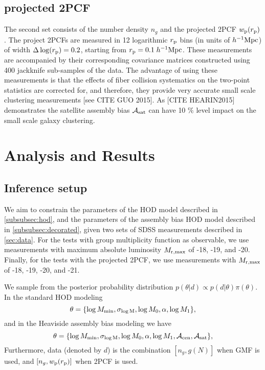 \documentclass[12pt, preprint]{aastex}
\newcommand{\beq}{\begin{equation}}
\newcommand{\eeq}{\end{equation}}
\newcommand{\mzero}{\log M_{0}}
\newcommand{\mone}{\log M_{1}}
\newcommand{\mmin}{\log M_{\rm min}}
\newcommand{\sigmam}{\sigma_{\log \rm M}}
\newcommand{\acen}{\mathcal{A}_{\rm cen}}
\newcommand{\asat}{\mathcal{A}_{\rm sat}}
\begin{document}
\subsection{projected 2PCF}

The second set consists of the number density $n_{g}$ and the projected 2PCF $w_{\rm{p}}(r_{\rm{p}})$. The project 2PCFs are measured in 12 logarithmic $r_{\rm p}$ bins (in units of $h^{-1}\rm{Mpc}$) of width $\Delta \log(r_{\rm p}) = 0.2$, starting from $r_{\rm{p}} = 0.1 \; h^{-1}\rm{Mpc}$. These measurements are accompanied by their corresponding covariance matrices constructed using 400 jackknife sub-samples of the data. The advantage of using these measurements is that the effects of fiber collision systematics on the two-point statistics are corrected for, and therefore, they provide very accurate small scale clustering measurements [see CITE GUO 2015]. As [CITE HEARIN2015] demonstrates the satellite assembly bias $\mathcal{A}_{\rm sat}$ can have 10 $\%$ level impact on the small scale galaxy clustering.  

\section{Analysis and Results}

\subsection{Inference setup}

We aim to constrain the parameters of the HOD model described in \ref{subsubsec:hod}, and the parameters of the assembly bias HOD model described in \ref{subsubsec:decorated}, given two sets of SDSS measurements described in \ref{sec:data}. For the tests with group multiplicity function as observable, we use measurements with maximum absolute luminosity $M_{\rm r , max}$ of -18, -19, and -20. Finally, for the tests with the projected 2PCF, we use measurements with $M_{\rm r , max}$ of -18, -19, -20, and -21.  

We sample from the posterior probability distribution $p(\theta|d) \propto p(d|\theta) \pi(\theta)$. In the standard HOD modeling 
\beq
\theta = \{ \mmin, \sigmam, \mzero, \alpha, \mone \},
\eeq
and in the Heaviside assembly bias modeling we have 
\beq
\theta = \{ \mmin, \sigmam, \mzero, \alpha, \mone, \acen, \asat \},
\eeq
Furthermore, data (denoted by $d$) is the combination $[n_{g},g(N)]$ when GMF is used, and $[n_{g}, w_{\rm{p}}(r_{\rm{p}})]$ when 2PCF is used.
\end{document}
